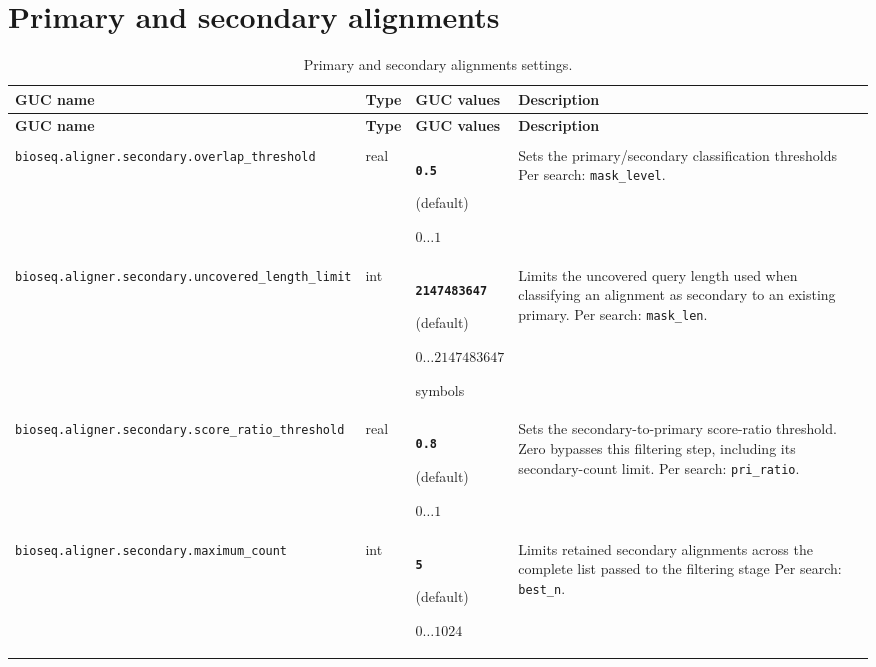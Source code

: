 \section{Primary and secondary alignments}
\begingroup
\footnotesize
\setlength{\tabcolsep}{3pt}
\renewcommand{\arraystretch}{1.12}
\begin{longtable}{@{}>{\raggedright\arraybackslash}p{.27\linewidth}>{\raggedright\arraybackslash}p{.07\linewidth}>{\raggedright\arraybackslash}p{.22\linewidth}>{\raggedright\arraybackslash}p{}@{}}
\caption{Primary and secondary alignments settings.}\label{tab:configuration-secondary}\\
\toprule
\textbf{GUC name} & \textbf{Type} & \textbf{GUC values} & \textbf{Description}\\
\midrule
\endfirsthead
\toprule
\textbf{GUC name} & \textbf{Type} & \textbf{GUC values} & \textbf{Description}\\
\midrule
\endhead
\midrule
\multicolumn{4}{r}{\textit{Continued on the next page}}\\
\endfoot
\bottomrule
\endlastfoot
\nolinkurl{bioseq.aligner.secondary.overlap_threshold} & real & {\bfseries \nolinkurl{0.5}}\par(default)\par $0\ldots 1$ & Sets the primary/secondary classification thresholds Per search: \nolinkurl{mask_level}.\\[4pt]
\midrule
\nolinkurl{bioseq.aligner.secondary.uncovered_length_limit} & int & {\bfseries \nolinkurl{2147483647}}\par(default)\par $0\ldots 2147483647$\par symbols & Limits the uncovered query length used when classifying an alignment as secondary to an existing primary. Per search: \nolinkurl{mask_len}.\\[4pt]
\midrule
\nolinkurl{bioseq.aligner.secondary.score_ratio_threshold} & real & {\bfseries \nolinkurl{0.8}}\par(default)\par $0\ldots 1$ & Sets the secondary-to-primary score-ratio threshold. Zero bypasses this filtering step, including its secondary-count limit. Per search: \nolinkurl{pri_ratio}.\\[4pt]
\midrule
\nolinkurl{bioseq.aligner.secondary.maximum_count} & int & {\bfseries \nolinkurl{5}}\par(default)\par $0\ldots 1024$ & Limits retained secondary alignments across the complete list passed to the filtering stage Per search: \nolinkurl{best_n}.\\[4pt]
\end{longtable}
\endgroup

